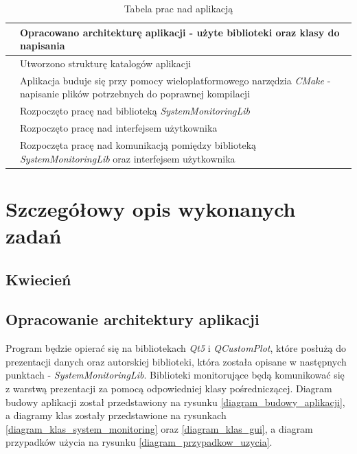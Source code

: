 \documentclass[a4paper]{article}
\newcounter{counter}
\newcommand\rownumber{\stepcounter{counter}\arabic{counter}}
\begin{document}
\begin{table}[h]
\centering
\begin{tabularx}{0.7\linewidth}{ |c|X| }
			\hline 
			\rownumber & Opracowano architekturę aplikacji - użyte biblioteki oraz 
						 klasy do napisania\\ \hline
			\rownumber & Utworzono strukturę katalogów aplikacji \\ \hline
			\rownumber & Aplikacja buduje się przy pomocy wieloplatformowego narzędzia 
						 \textit{CMake} - napisanie plików potrzebnych do poprawnej kompilacji \\ \hline
			\rownumber & Rozpoczęto pracę nad biblioteką \textit{SystemMonitoringLib} \\ \hline
			\rownumber & Rozpoczęto pracę nad interfejsem użytkownika \\ \hline
			\rownumber & Rozpoczęta pracę nad komunikacją pomiędzy biblioteką \textit{SystemMonitoringLib} oraz interfejsem użytkownika \\ \hline
	\end{tabularx}
	\caption{Tabela prac nad aplikacją}
\end{table}

\section{Szczegółowy opis wykonanych zadań}

\subsection{Kwiecień}

\subsection{Opracowanie architektury aplikacji}
Program będzie opierać się na bibliotekach \textit{Qt5} i \textit{QCustomPlot}, które posłużą do prezentacji danych oraz autorskiej biblioteki, która została opisane w następnych punktach - \textit{SystemMonitoringLib}. Biblioteki monitorujące będą komunikować się z warstwą prezentacji za pomocą odpowiedniej klasy pośredniczącej. Diagram budowy aplikacji został przedstawiony na rysunku \ref{diagram_budowy_aplikacji}, a diagramy klas zostały przedstawione na rysunkach \ref{diagram_klas_system_monitoring} oraz \ref{diagram_klas_gui}, a diagram przypadków użycia na rysunku \ref{diagram_przypadkow_uzycia}.
\end{document}
